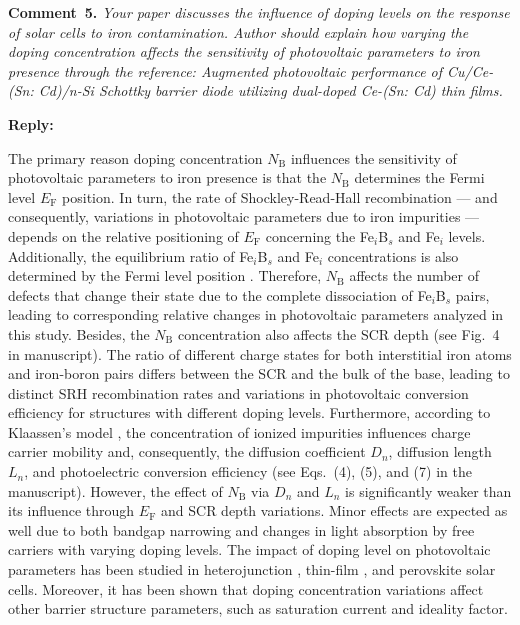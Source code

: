 \documentclass[a4paper,fleqn]{cas-sc}
\begin{document}
\vspace{1cm}
\noindent
\textcolor[rgb]{0.00,0.50,1.00}{\textbf{Comment~5.}}
\emph{Your paper discusses the influence of doping levels on the response of solar cells to iron contamination.
Author should explain how varying the doping concentration affects the sensitivity of photovoltaic parameters to iron presence through the reference:
Augmented photovoltaic performance of Cu/Ce-(Sn: Cd)/n-Si Schottky barrier diode utilizing dual-doped Ce-(Sn: Cd) thin films.}

\noindent
\textcolor[rgb]{0.51,0.00,0.00}{\textbf{Reply:}}


The primary reason doping concentration $N_\mathrm{B}$ influences the sensitivity of photovoltaic
parameters to iron presence is that the $N_\mathrm{B}$ determines the Fermi level $E_\mathrm{F}$ position.
In turn, the rate of Shockley-Read-Hall recombination ---
and consequently, variations in photovoltaic parameters due to iron impurities ---
depends on the relative positioning of $E_\mathrm{F}$ concerning the Fe$_i$B$_s$ and Fe$_i$ levels.
Additionally, the equilibrium ratio of Fe$_i$B$_s$ and Fe$_i$ concentrations is also determined by the Fermi level position \cite{FeB:kinetic,MurphyJAP2011}.
Therefore, $N_\mathrm{B}$ affects the number of defects that change their state due to the complete dissociation of Fe$_i$B$_s$ pairs,
leading to corresponding relative changes in photovoltaic parameters analyzed in this study.
Besides, the $N_\mathrm{B}$ concentration also affects the SCR depth (see Fig.~4 in manuscript).
The ratio of different charge states for both interstitial iron atoms and iron-boron pairs differs between the SCR and the bulk of the base, leading to distinct SRH recombination rates and variations in photovoltaic conversion efficiency for structures with different doping levels.
Furthermore, according to Klaassen’s model \cite{KLAASSEN953},
the concentration of ionized impurities influences charge carrier mobility and, consequently, the diffusion coefficient $D_n$, diffusion length $L_n$,
and photoelectric conversion efficiency (see Eqs.~(4), (5), and (7) in the manuscript).
However, the effect of $N_\mathrm{B}$ via $D_n$ and $L_n$ is significantly weaker than its influence through $E_\mathrm{F}$ and SCR depth variations.
Minor effects are expected as well due to both bandgap narrowing and changes in light absorption by free carriers with varying doping levels.
The impact of doping level on photovoltaic parameters has been studied in heterojunction \cite{Sultana2024},
thin-film \cite{Akila2024},
and perovskite \cite{MasumMia2025} solar cells.
Moreover, it has been shown \cite{Akila2024} that
doping concentration variations affect other barrier structure parameters, such as saturation current and ideality factor.
\end{document}
